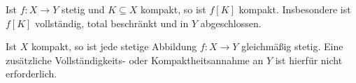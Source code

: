 \begin{theorem}
\label{b47guide:thm:compact-image}
Ist $f:X\to Y$ stetig und $K\subseteq X$ kompakt, so ist $f[K]$
kompakt. Insbesondere ist $f[K]$ vollständig, total beschränkt
und in $Y$ abgeschlossen.
\cite{metric-notes}
\end{theorem}

\begin{theorem}
\label{b47guide:thm:heine-cantor}
Ist $X$ kompakt, so ist jede stetige Abbildung $f:X\to Y$
gleichmäßig stetig. Eine zusätzliche Vollständigkeits- oder
Kompaktheitsannahme an $Y$ ist hierfür nicht erforderlich.
\cite{metric-notes}
\end{theorem}

